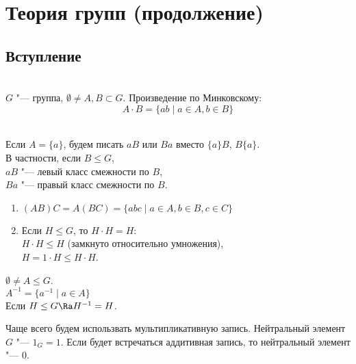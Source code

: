 ﻿\chapter{Теория групп (продолжение)}

\section{Вступление}

\begin{Def} \hfill \\
	$G$ "--- группа, $\emptyset \ne A, B \subset G$.
	Произведение по Минковскому:
	\[ A \cdot B = \{ab \mid a \in A, b \in B\} \]
\end{Def}                                                       
\begin{Def} \hfill \\
        Если $A = \{a\}$, будем писать $aB$ или $Ba$ вместо $\{a\}B$, $B\{a\}$.\\
	В частности, если $B \le G$,\\
	$aB$ "--- левый класс смежности по $B$,\\
	$Ba$ "--- правый класс смежности по $B$.\\
\end{Def}

\begin{conseq}\hfill
	\begin{enumerate}
	\item
	$(AB)C = A(BC) = \{abc \mid a \in A, b \in B, c \in C\}$
	\item
		Если $H \le G$, то $H \cdot H = H$:\\
		$H \cdot H \le H$ (замкнуто относительно умножения),\\
		$H = 1 \cdot H \le H \cdot H$.
	\end{enumerate}
\end{conseq}

\begin{Def}
	$\emptyset \ne A \le G$.  \\
	$A^{-1} = \{a^{-1} \mid a \in A\}$ \\
	Если $H \le G \Ra H^{-1} = H$.
\end{Def}

\begin{Rem}
	Чаще всего будем использвать мультипликативную запись.
	Нейтральный элемент $G$ "--- $1_{G} = 1$.
	Если будет встречаться аддитивная запись, то нейтральный элемент "--- $0$.
\end{Rem}


